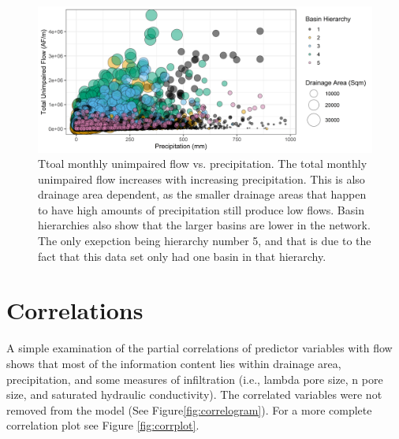 \begin{figure}
	\centering
	\includegraphics[width=\textwidth, trim={0 0 0 0}, clip=true]{plots/rplot05_pptvsflow.png}
	\caption{Ttoal monthly unimpaired flow vs. precipitation. The total monthly unimpaired flow increases with increasing precipitation. This is also drainage area dependent, as the smaller drainage areas that happen to have high amounts of precipitation still produce low flows. Basin hierarchies also show that the larger basins are lower in the network. The only exepction being hierarchy number 5, and that is due to the fact that this data set only had one basin in that hierarchy.} 
	\label{fig:flowvsppt}
\end{figure}

\section*{Correlations}
A simple examination of the partial correlations of predictor variables with flow shows that most of the information content lies within drainage area, precipitation, and some measures of infiltration (i.e., lambda pore size, n pore size, and saturated hydraulic conductivity). The correlated variables were not removed from the model (See Figure\ref{fig:correlogram}). For a more complete correlation plot see Figure \ref{fig:corrplot}. 

